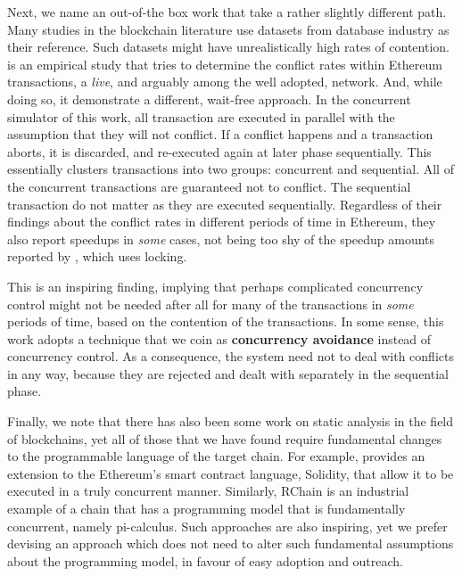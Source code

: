 Next, we name an out-of-the box work that take a rather slightly different path. Many studies in the
blockchain literature use datasets from database industry as their reference. Such datasets might
have unrealistically high rates of contention. \cite{saraphYOLOEmpiricalStudy2019} is an empirical
study that tries to determine the conflict rates within Ethereum transactions, a \textit{live}, and
arguably among the well adopted, network. And, while doing so, it demonstrate a different, wait-free
approach. In the concurrent simulator of this work, all transaction are executed in parallel with
the assumption that they will not conflict. If a conflict happens and a transaction aborts, it is
discarded, and re-executed again at later phase sequentially. This essentially clusters transactions
into two groups: concurrent and sequential. All of the concurrent transactions are guaranteed not to
conflict. The sequential transaction do not matter as they are executed sequentially. Regardless of
their findings about the conflict rates in different periods of time in Ethereum, they also report
speedups in \textit{some} cases, not being too shy of the speedup amounts reported by
\cite{dickersonSmartLocksAddingConcurrency2017}, which uses locking.

This is an inspiring finding, implying that perhaps complicated concurrency control might not be
needed after all for many of the transactions in \textit{some} periods of time, based on the
contention of the transactions. In some sense, this work adopts a technique that we coin as
\textbf{concurrency avoidance} instead of concurrency control. As a consequence, the system need not
to deal with conflicts in any way, because they are rejected and dealt with separately in the
sequential phase.

Finally, we note that there has also been some work on static analysis in the field of blockchains,
yet all of those that we have found require fundamental changes to the programmable language of the
target chain. For example, \cite{bartolettiStaticTrueConcurrent2019} provides an extension to the
Ethereum's smart contract language, Solidity, that allow it to be executed in a truly concurrent
manner. Similarly, RChain is an industrial example of a chain that has a programming model that is
fundamentally concurrent\cite{darrylRCast21Currency2019}, namely
pi-calculus\cite{turnerPolymorphicPiCalculusTheory1996}. Such approaches are also inspiring, yet we
prefer devising an approach which does not need to alter such fundamental assumptions about the
programming model, in favour of easy adoption and outreach.



